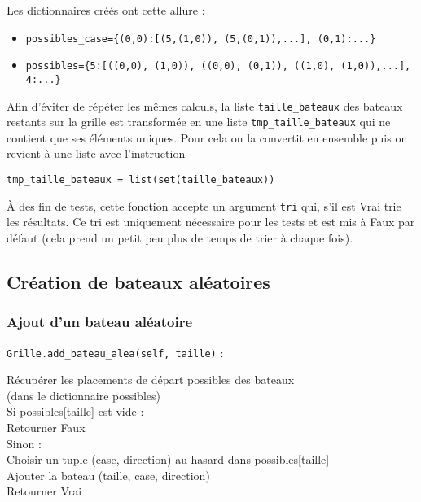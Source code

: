 Les dictionnaires créés ont cette allure :
\begin{itemize}
\item \texttt{possibles\_case=\{(0,0):[(5,(1,0)), (5,(0,1)),...], (0,1):...\}}
\item \texttt{possibles=\{5:[((0,0), (1,0)), ((0,0), (0,1)), ((1,0), (1,0)),...], 4:...\}}
\end{itemize}

\medskip

Afin d'éviter de répéter les mêmes calculs, la liste \texttt{taille\_bateaux} des bateaux restants sur la grille est transformée en une liste \texttt{tmp\_taille\_bateaux} qui ne contient que ses éléments uniques. Pour cela on la convertit en ensemble puis on revient à une liste avec l'instruction 
\begin{center}
\texttt{tmp\_taille\_bateaux = list(set(taille\_bateaux))}
\end{center}

\medskip

À des fin de tests, cette fonction accepte un argument \texttt{tri} qui, s'il est Vrai trie les résultats. Ce tri est uniquement nécessaire pour les tests et est mis à Faux par défaut (cela prend un petit peu plus de temps de trier à chaque fois).

\newpage

\subsection{Création de bateaux aléatoires}
\subsubsection{Ajout d'un bateau aléatoire}\label{add_bateau_alea}
\texttt{Grille.add\_bateau\_alea(self, taille)} :
\begin{algo1}
Récupérer les placements de départ possibles des bateaux\\
(dans le dictionnaire possibles)\\
Si possibles[taille] est vide :\\
Retourner Faux\\
Sinon :\\
Choisir un tuple (case, direction) au hasard dans possibles[taille]\\
Ajouter la bateau (taille, case, direction)\\
Retourner Vrai\\ 
\end{algo1}

